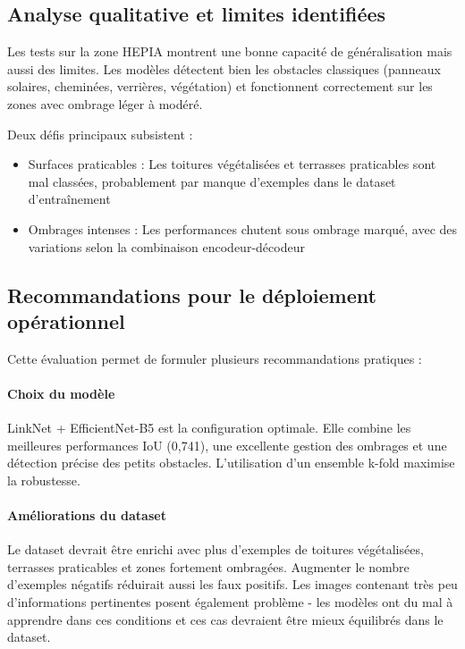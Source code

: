 \subsection{Analyse qualitative et limites identifiées}

Les tests sur la zone HEPIA montrent une bonne capacité de généralisation mais aussi des limites. Les modèles détectent bien les obstacles classiques (panneaux solaires, cheminées, verrières, végétation) et fonctionnent correctement sur les zones avec ombrage léger à modéré.

Deux défis principaux subsistent :

\begin{itemize}
    \item Surfaces praticables : Les toitures végétalisées et terrasses praticables sont mal classées, probablement par manque d'exemples dans le dataset d'entraînement
    \item Ombrages intenses : Les performances chutent sous ombrage marqué, avec des variations selon la combinaison encodeur-décodeur
\end{itemize}

\subsection{Recommandations pour le déploiement opérationnel}

Cette évaluation permet de formuler plusieurs recommandations pratiques :

\paragraph{Choix du modèle}
LinkNet + EfficientNet-B5 est la configuration optimale. Elle combine les meilleures performances IoU (0,741), une excellente gestion des ombrages et une détection précise des petits obstacles. L'utilisation d'un ensemble k-fold maximise la robustesse.

\paragraph{Améliorations du dataset}
Le dataset devrait être enrichi avec plus d'exemples de toitures végétalisées, terrasses praticables et zones fortement ombragées. Augmenter le nombre d'exemples négatifs réduirait aussi les faux positifs. Les images contenant très peu d'informations pertinentes posent également problème - les modèles ont du mal à apprendre dans ces conditions et ces cas devraient être mieux équilibrés dans le dataset.

